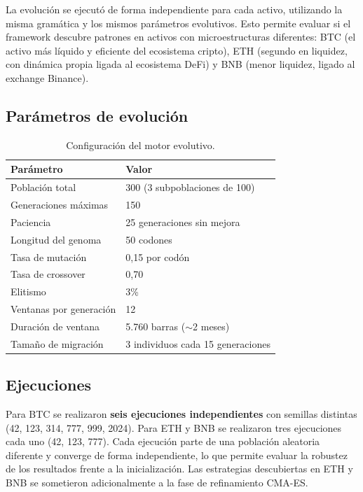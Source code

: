\documentclass[12pt,a4paper]{article}
\begin{document}
La evolución se ejecutó de forma independiente para cada activo, utilizando la
misma gramática y los mismos parámetros evolutivos. Esto permite evaluar si el
framework descubre patrones en activos con microestructuras diferentes: BTC (el
activo más líquido y eficiente del ecosistema cripto), ETH (segundo en liquidez,
con dinámica propia ligada al ecosistema DeFi) y BNB (menor liquidez, ligado al
exchange Binance).

\subsection{Parámetros de evolución}

\begin{table}[H]
\centering
\caption{Configuración del motor evolutivo.}
\label{tab:evo_params}
\begin{tabular}{ll}
\toprule
\textbf{Parámetro} & \textbf{Valor} \\
\midrule
Población total & 300 (3 subpoblaciones de 100) \\
Generaciones máximas & 150 \\
Paciencia & 25 generaciones sin mejora \\
Longitud del genoma & 50 codones \\
Tasa de mutación & 0,15 por codón \\
Tasa de crossover & 0,70 \\
Elitismo & 3\% \\
Ventanas por generación & 12 \\
Duración de ventana & 5.760 barras ($\sim$2 meses) \\
Tamaño de migración & 3 individuos cada 15 generaciones \\
\bottomrule
\end{tabular}
\end{table}

\subsection{Ejecuciones}

Para BTC se realizaron \textbf{seis ejecuciones independientes} con semillas distintas
(42, 123, 314, 777, 999, 2024). Para ETH y BNB se realizaron tres ejecuciones cada uno
(42, 123, 777). Cada ejecución parte de una población aleatoria diferente y converge
de forma independiente, lo que permite evaluar la robustez de los resultados frente a
la inicialización. Las estrategias descubiertas en ETH y BNB se sometieron
adicionalmente a la fase de refinamiento CMA-ES.
\end{document}
